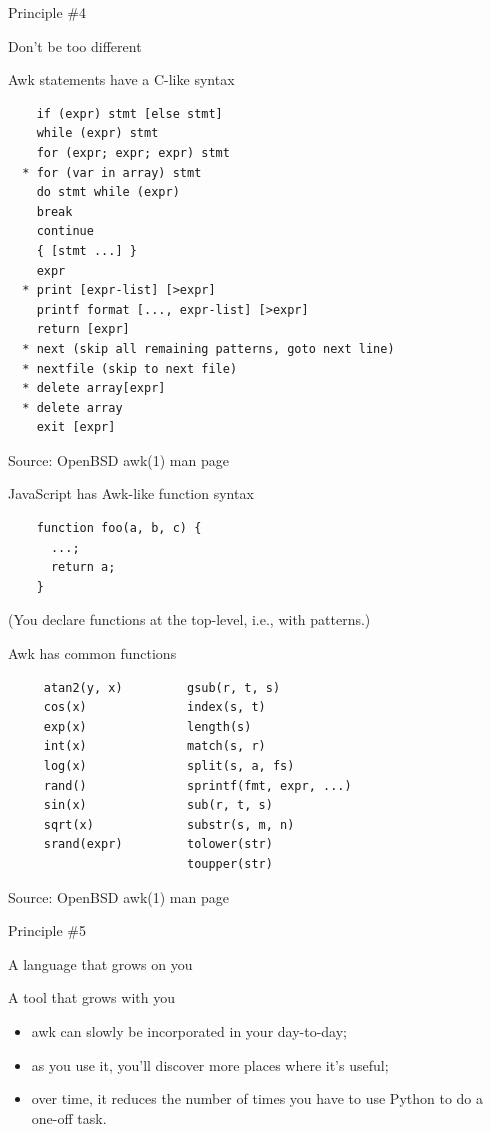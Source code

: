 \documentclass{beamer}
\renewcommand\big[1]{
  \begin{center}
    \Large{#1}
  \end{center}
}
\begin{document}
\begin{frame}
  \centering\Huge{Principle \#4}
  \big{Don't be too different}
\end{frame}

\begin{frame}[fragile]
  \big{Awk statements have a C-like syntax}

  \begin{lstlisting}
    if (expr) stmt [else stmt]
    while (expr) stmt
    for (expr; expr; expr) stmt
  * for (var in array) stmt
    do stmt while (expr)
    break
    continue
    { [stmt ...] }
    expr
  * print [expr-list] [>expr]
    printf format [..., expr-list] [>expr]
    return [expr]
  * next (skip all remaining patterns, goto next line)
  * nextfile (skip to next file)
  * delete array[expr]
  * delete array
    exit [expr]
  \end{lstlisting}
  \scriptsize{Source: OpenBSD awk(1) man page}
\end{frame}

\begin{frame}[fragile]
  \big{JavaScript has Awk-like function syntax}

  \begin{lstlisting}
    function foo(a, b, c) {
      ...;
      return a;
    }
  \end{lstlisting}

  \scriptsize{(You declare functions at the top-level, i.e., with patterns.)}
\end{frame}

\begin{frame}[fragile]
  \big{Awk has common functions}
  \begin{lstlisting}
     atan2(y, x)         gsub(r, t, s)
     cos(x)              index(s, t)
     exp(x)              length(s)
     int(x)              match(s, r)
     log(x)              split(s, a, fs)
     rand()              sprintf(fmt, expr, ...)
     sin(x)              sub(r, t, s)
     sqrt(x)             substr(s, m, n)
     srand(expr)         tolower(str)
                         toupper(str)
  \end{lstlisting}

  \scriptsize{Source: OpenBSD awk(1) man page}
\end{frame}

\begin{frame}
  \centering\Huge{Principle \#5}
  \big{A language that grows on you}
\end{frame}

\begin{frame}
  \big{A tool that grows with you}

  \begin{itemize}
    \item awk can slowly be incorporated in your day-to-day;
    \item as you use it, you'll discover more places where it's useful;
    \item over time, it reduces the number of times you have to use Python to do a one-off task.
  \end{itemize}
\end{frame}
\end{document}

